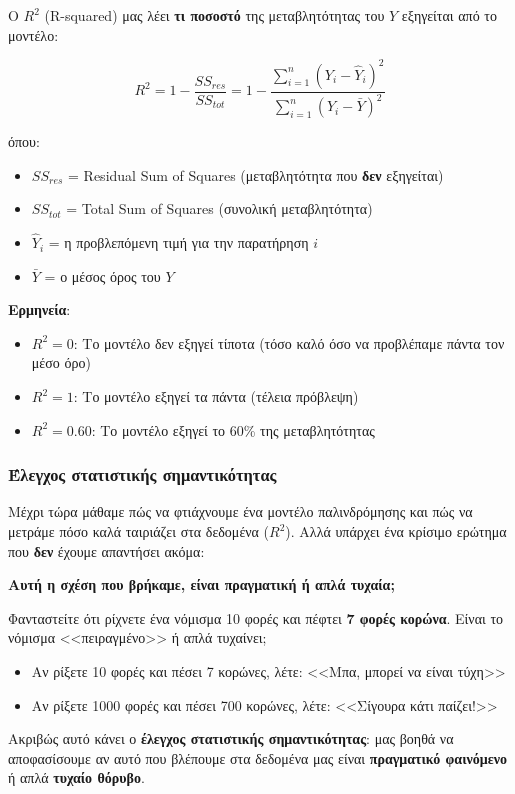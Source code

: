 \documentclass[12pt,a4paper]{article}
\begin{document}
\begin{theorybox}
Ο $R^2$ (R-squared) μας λέει \textbf{τι ποσοστό} της μεταβλητότητας του $Y$ εξηγείται από το μοντέλο:

\begin{equation}
R^2 = 1 - \frac{SS_{res}}{SS_{tot}} = 1 - \frac{\sum_{i=1}^{n}(Y_i - \hat{Y}_i)^2}{\sum_{i=1}^{n}(Y_i - \bar{Y})^2}
\end{equation}

όπου:
\begin{itemize}
    \item $SS_{res}$ = Residual Sum of Squares (μεταβλητότητα που \textbf{δεν} εξηγείται)
    \item $SS_{tot}$ = Total Sum of Squares (συνολική μεταβλητότητα)
    \item $\hat{Y}_i$ = η προβλεπόμενη τιμή για την παρατήρηση $i$
    \item $\bar{Y}$ = ο μέσος όρος του $Y$
\end{itemize}

\textbf{Ερμηνεία}:
\begin{itemize}
    \item $R^2 = 0$: Το μοντέλο δεν εξηγεί τίποτα (τόσο καλό όσο να προβλέπαμε πάντα τον μέσο όρο)
    \item $R^2 = 1$: Το μοντέλο εξηγεί τα πάντα (τέλεια πρόβλεψη)
    \item $R^2 = 0.60$: Το μοντέλο εξηγεί το 60\% της μεταβλητότητας
\end{itemize}
\end{theorybox}

\subsubsection{Έλεγχος στατιστικής σημαντικότητας}

Μέχρι τώρα μάθαμε πώς να φτιάχνουμε ένα μοντέλο παλινδρόμησης και πώς να μετράμε πόσο καλά ταιριάζει στα δεδομένα ($R^2$). Αλλά υπάρχει ένα κρίσιμο ερώτημα που \textbf{δεν} έχουμε απαντήσει ακόμα:

\textbf{Αυτή η σχέση που βρήκαμε, είναι πραγματική ή απλά τυχαία;}

\begin{examplebox}
Φανταστείτε ότι ρίχνετε ένα νόμισμα 10 φορές και πέφτει \textbf{7 φορές κορώνα}. Είναι το νόμισμα <<πειραγμένο>> ή απλά τυχαίνει;

\begin{itemize}
    \item Αν ρίξετε 10 φορές και πέσει 7 κορώνες, λέτε: <<Μπα, μπορεί να είναι τύχη>>
    \item Αν ρίξετε 1000 φορές και πέσει 700 κορώνες, λέτε: <<Σίγουρα κάτι παίζει!>>
\end{itemize}

Ακριβώς αυτό κάνει ο \textbf{έλεγχος στατιστικής σημαντικότητας}: μας βοηθά να αποφασίσουμε αν αυτό που βλέπουμε στα δεδομένα μας είναι \textbf{πραγματικό φαινόμενο} ή απλά \textbf{τυχαίο θόρυβο}.
\end{examplebox}
\end{document}
